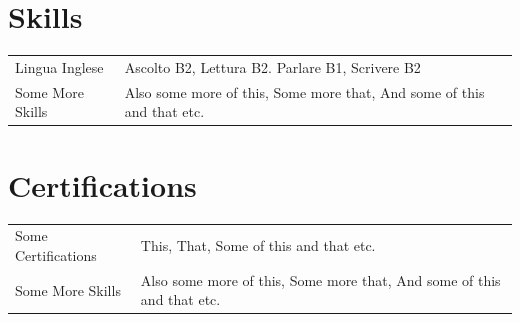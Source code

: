 \documentclass[a4paper,12pt]{article}
\begin{document}
\section{Skills}
\begin{tabularx}{\linewidth}{@{}l X@{}}
Lingua Inglese &  \normalsize{Ascolto B2, Lettura B2. Parlare B1, Scrivere B2}\\
Some More Skills  &  \normalsize{Also some more of this, Some more that, And some of this and that etc.}\\  
\end{tabularx}

\section{Certifications}
\begin{tabularx}{\linewidth}{@{}l X@{}}
Some Certifications &  \normalsize{This, That, Some of this and that etc.}\\
Some More Skills  &  \normalsize{Also some more of this, Some more that, And some of this and that etc.}\\  
\end{tabularx}

{}
\end{document}
